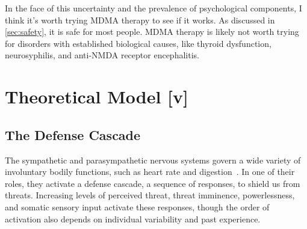 \documentclass[11pt,oneside]{book}
\let\cite\parencite
\begin{document}
In the face of this uncertainty and the prevalence of psychological components, I think it's worth trying MDMA therapy to see if it works. As discussed in \cref{sec:safety}, it is safe for most people. MDMA therapy is likely not worth trying for disorders with established biological causes, like thyroid dysfunction, neurosyphilis, and anti-NMDA receptor encephalitis.

\chapter{Theoretical Model [v]}
\label{science}
\section{The Defense Cascade}
\label{sec:defensecascade}
The sympathetic and parasympathetic nervous systems govern a wide variety of involuntary bodily functions, such as heart rate and digestion~\cite{kozlowskaDefenseCascade}. In one of their roles, they activate a defense cascade, a sequence of responses, to shield us from threats. Increasing levels of perceived threat, threat imminence, powerlessness, and somatic sensory input activate these responses, though the order of activation also depends on individual variability and past experience.
\end{document}
